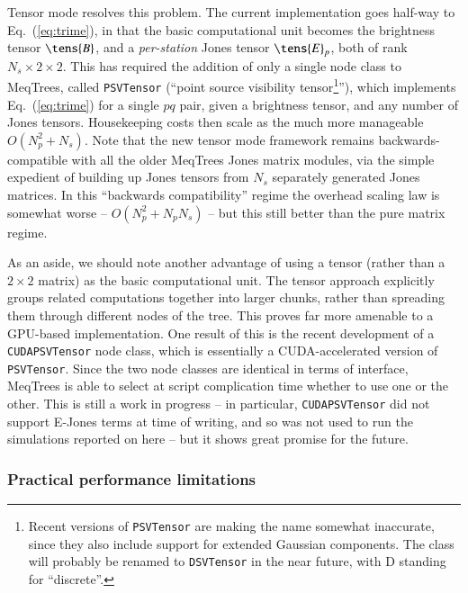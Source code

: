 \documentclass{aa}
\begin{document}
Tensor mode resolves this problem. The current implementation goes half-way to Eq.~(\ref{eq:trime}), in that the basic computational unit becomes the brightness tensor $\tens{B}$, and a \emph{per-station} Jones tensor $\tens{E}_p$, both of rank $N_s\times2\times2$. This has required the addition of only a single node class to MeqTrees, called {\tt PSVTensor} (``point source visibility tensor\footnote{Recent versions of {\tt PSVTensor} are making the name somewhat inaccurate, since they also include support for extended Gaussian components. The class will probably be renamed to {\tt DSVTensor} in the near future, with D standing for ``discrete''.}''), which implements Eq.~(\ref{eq:trime}) for a single $pq$ pair, given a brightness tensor, and any number of Jones tensors. Housekeeping costs then scale as the much more manageable $O(N_p^2+N_s)$. Note that the new tensor mode framework remains backwards-compatible with all the older MeqTrees Jones matrix modules, via the simple expedient of building up Jones 
tensors from $N_s$ separately generated Jones matrices. In this ``backwards compatibility'' regime the overhead scaling law is somewhat worse --  $O(N_p^2+N_p N_s)$ -- but this still better than the pure matrix regime. 

As an aside, we should note another advantage of using a tensor (rather than a $2\times2$ matrix) as the basic computational unit. The tensor approach explicitly groups related computations together into larger chunks, 
rather than spreading them through different nodes of the tree. This proves far more amenable to a GPU-based implementation. One result of this is the recent development of a {\tt CUDAPSVTensor} node class, which is 
essentially a CUDA-accelerated version of {\tt PSVTensor}. Since the two node classes are identical in terms of interface, MeqTrees is able to select at script complication time whether to use one or the other. This is still a work in progress -- in particular, {\tt CUDAPSVTensor} did not support E-Jones terms at time of writing, and so was not used to run the simulations reported on here -- but it shows great promise for the future.


\subsubsection{Practical performance limitations}
\label{sec:performance}
\end{document}
